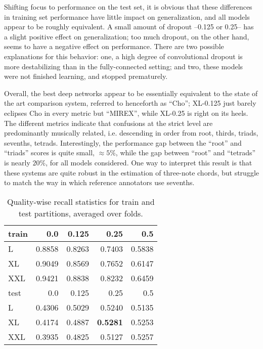 Shifting focus to performance on the test set, it is obvious that these differences in training set performance have little impact on generalization, and all models appear to be roughly equivalent.
A small amount of dropout --0.125 or 0.25-- has a slight positive effect on generalization; too much dropout, on the other hand, seems to have a negative effect on performance.
There are two possible explanations for this behavior:
one, a high degree of convolutional dropout is more destabilizing than in the fully-connected setting;
and two, these models were not finished learning, and stopped prematurely.

Overall, the best deep networks appear to be essentially equivalent to the state of the art comparison system, referred to henceforth as ``Cho''; XL-0.125 just barely eclipses Cho in every metric but ``MIREX'', while XL-0.25 is right on its heels.
The different metrics indicate that confusions at the strict level are predominantly musically related, i.e. descending in order from root, thirds, triads, sevenths, tetrads.
Interestingly, the performance gap between the ``root'' and ``triads'' scores is quite small, $\approx 5\%$, while the gap between ``root'' and ``tetrads'' is nearly $20\%$, for all models considered.
One way to interpret this result is that these systems are quite robust in the estimation of three-note chords, but struggle to match the way in which reference annotators use sevenths.


\begin{table}[t]
\begin{center}
\caption{Quality-wise recall statistics for train and test partitions, averaged over folds.}
\label{tab:qwise_macro_recall}
\begin{tabular}{l|rrrr}
\hline
 train   &    0.0 &   0.125 &   0.25 &    0.5 \\
\hline
 L       & 0.8858 &  0.8263 & 0.7403 & 0.5838 \\
 XL      & 0.9049 &  0.8569 & 0.7652 & 0.6147 \\
 XXL     & 0.9421 &  0.8838 & 0.8232 & 0.6459 \\
\hline
 test   &    0.0 &   0.125 &   0.25 &    0.5 \\
\hline
 L      & 0.4306 &  0.5029 & 0.5240 & 0.5135 \\
 XL     & 0.4174 &  0.4887 & \textbf{0.5281} & 0.5253 \\
 XXL    & 0.3935 &  0.4825 & 0.5127 & 0.5257 \\
\hline
\end{tabular}
\end{center}
\end{table}

